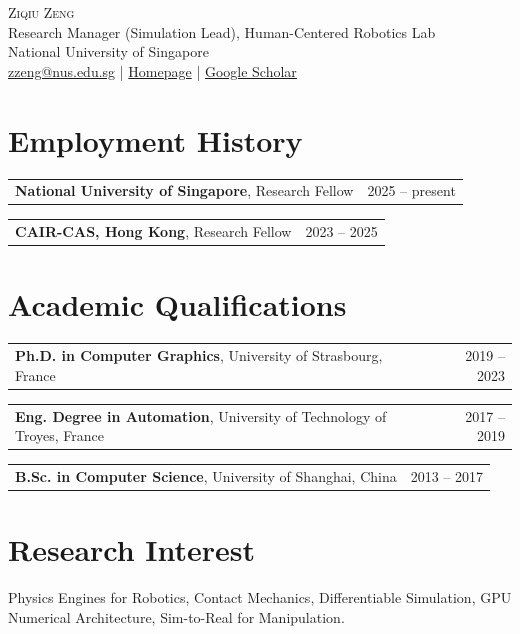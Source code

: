 \documentclass[11pt,a4paper]{article}
\makeatletter
\newcommand{\myname}{Ziqiu Zeng}
\newcommand{\myrole}{Research Manager (Simulation Lead), Human-Centered Robotics Lab}
\newcommand{\myaffil}{National University of Singapore}
\newcommand{\myemail}{zzeng@nus.edu.sg}
\newcommand{\myhomepage}{https://ziqiu-zeng.github.io/homepage}
\newcommand{\myscholar}{https://scholar.google.com/citations?user=u7adOeQAAAAJ&hl=en}
\newcommand{\daterow}[2]{%
  \noindent\begin{tabularx}{\linewidth}{@{}X r@{}}#1 & #2\end{tabularx}\par}
\makeatother
\begin{document}
\begin{center}
  {\LARGE\scshape \myname}\\[0.45em]
  \myrole\\
  \myaffil\\[0.35em]
  \href{mailto:\myemail}{\myemail} \quad|\quad
  \href{\myhomepage}{Homepage} \quad|\quad
  \href{\myscholar}{Google Scholar}
\end{center}
\vspace{0.3em}

\section{Employment History}
\daterow{\textbf{National University of Singapore}, Research Fellow}{2025 -- present}
\daterow{\textbf{CAIR-CAS, Hong Kong}, Research Fellow}{2023 -- 2025}

\section{Academic Qualifications}
\daterow{\textbf{Ph.D. in Computer Graphics}, University of Strasbourg, France}{2019 -- 2023}
\daterow{\textbf{Eng. Degree in Automation}, University of Technology of Troyes, France}{2017 -- 2019}
\daterow{\textbf{B.Sc. in Computer Science}, University of Shanghai, China}{2013 -- 2017}

\section{Research Interest}
Physics Engines for Robotics, Contact Mechanics, Differentiable Simulation,
GPU Numerical Architecture, Sim-to-Real for Manipulation.

\end{document}
